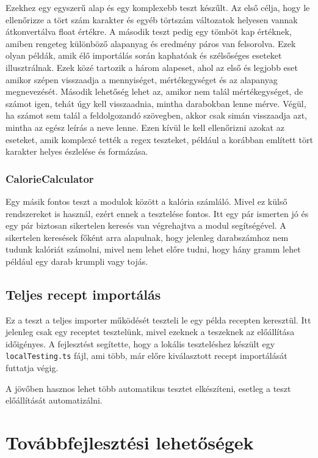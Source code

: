 \documentclass[12pt]{report}
\theoremstyle{definition}
\begin{document}
Ezekhez egy egyszerű alap és egy komplexebb teszt készűlt. Az első célja, hogy le ellenőrizze a tört szám karakter és egyéb törtszám változatok helyesen vannak átkonvertálva float értékre. A második teszt pedig egy tömböt kap értéknek, amiben rengeteg különböző alapanyag és eredmény páros van felsorolva. Ezek olyan példák, amik élő importálás során kaphatóak és szélsőséges eseteket illusztrálnak. Ezek közé tartozik a három alapeset, ahol az első és legjobb eset amikor szépen visszaadja a mennyiséget, mértékegységet és az alapanyag megnevezését. Második lehetőség lehet az, amikor nem talál mértékegységet, de számot igen, tehát úgy kell visszaadnia, mintha darabokban lenne mérve. Végül, ha számot sem talál a feldolgozandó szövegben, akkor csak simán visszaadja azt, mintha az egész leírás a neve lenne. Ezen kívül le kell ellenőrizni azokat az eseteket, amik komplexé tették a \Gls{regex} teszteket, például a korábban említett tört karakter helyes észlelése és formázása.


\subsection{CalorieCalculator}
Egy másik fontos teszt a modulok között a kalória számláló. Mivel ez külső rendszereket is használ, ezért ennek a tesztelése fontos. Itt egy pár ismerten jó és egy pár biztosan sikertelen keresés van végrehajtva a modul segítségével. A sikertelen keresések főként arra alapulnak, hogy jelenleg darabszámhoz nem tudunk kalóriát számolni, mivel nem lehet előre tudni, hogy hány gramm lehet például egy darab krumpli vagy tojás.

\section{Teljes recept importálás}
Ez a teszt a teljes importer működését teszteli le egy példa recepten keresztül. Itt jelenleg csak egy receptet tesztelünk, mivel ezeknek a teszeknek az előállítása időigényes.
A fejlesztést segítette, hogy a lokális teszteléshez készült egy \texttt{localTesting.ts} fájl, ami több, már előre kiválasztott recept importálását futtatja végig.

A jövőben hasznos lehet több automatikus tesztet elkészíteni, esetleg a teszt előállítását automatizálni.


\chapter{Továbbfejlesztési lehetőségek}
\end{document}
